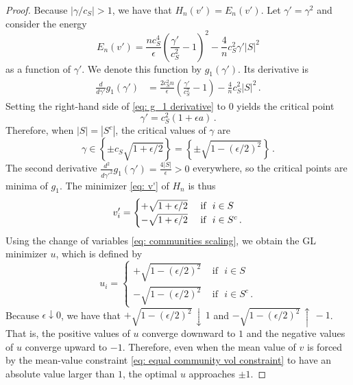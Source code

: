 \documentclass[11pt]{amsart}
\def\ep{\epsilon}
\numberwithin{equation}{section}
\begin{document}
\begin{proof}
Because $\left|{\gamma}/{c_S}\right| > 1$, we have that $H_n(v') = E_n(v')$. Let $\gamma' = \gamma^2$ and consider the energy
\begin{equation}\label{eq: g_1}
    E_n(v') = \frac{n c_S^4}{\ep} \left(\frac{ \gamma'}{c_S^2} - 1\right)^2 - \frac{4}{n} c_S^2 \gamma' |S|^2
\end{equation}
as a function of $\gamma'$. We denote this function by $g_1(\gamma')$.
Its derivative is
\begin{align}\label{eq: g_1 derivative}
    \frac{d}{d\gamma'}g_1(\gamma') &=  \frac{2c_S^2 n}{\ep} \left(\frac{\gamma'}{c_S^2} - 1\right) - \frac{4}{n} c_S^2 |S|^2\,.
\end{align}
Setting {the right-hand side of} \eqref{eq: g_1 derivative} to $0$ yields the critical point
\begin{equation*}
    \gamma' = c_S^2 \left(1 + \ep a \right) \,.
\end{equation*} 
Therefore, when $|S| = |S^c|$, the {critical values of $\gamma$ are}
\begin{equation*}
    \gamma \in \left \{\pm c_S \sqrt{1 + \ep/2}\right\} = \left\{\pm \sqrt{1 - (\ep/2)^2}\right\}\,. 
\end{equation*} 
The second derivative $\frac{d^2}{d\gamma'^2}g_1(\gamma') = \frac{4|S|}{\ep} > 0$ everywhere, so the critical points are minima of $g_1$. The minimizer \eqref{eq: v'} of $H_n$ is thus
\begin{equation}
    v'_i = \begin{cases}
        +\sqrt{1+\ep/2} &\text{ if }\,\, i\in S 
        \\
        -\sqrt{1+\ep/2} &\text{ if \,\,} i\in S^c   \,.  
    \end{cases}
\end{equation}
Using the change of variables \eqref{eq: communities scaling}, we obtain the GL minimizer $u$, which is defined by 
\begin{equation}
    u_i = \begin{cases}
        +\sqrt{1 - (\ep/2)^2} &\text{ if }\,\, i\in S 
        \\
        -\sqrt{1 - (\ep/2)^2} &\text{ if }\,\, i\in S^c   \,. 
    \end{cases}
\end{equation}
Because $\ep \downarrow 0$, we have that $+\sqrt{1 - (\ep/2)^2} \, \downarrow \, 1$ and $-\sqrt{1 - (\ep/2)^2} \, \uparrow \, -1$. {That is, the positive values of $u$ converge downward to $1$ and the negative values {of $u$} converge upward to $-1$.} Therefore, even when the mean value of $v$ is forced by the {mean-value constraint} \eqref{eq: equal community vol constraint} to have an absolute value larger than $1$, the optimal $u$ approaches $\pm 1$. 



\end{proof}
\end{document}
